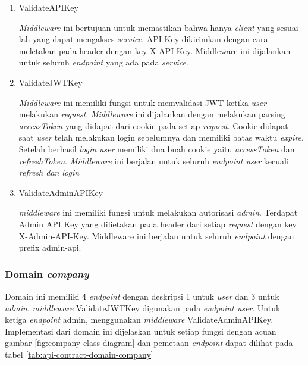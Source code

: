 \begin{enumerate}
  \item ValidateAPIKey

        \textit{Middleware} ini bertujuan untuk memastikan bahwa hanya \textit{client} yang sesuai lah yang dapat mengakses \textit{service}. API Key dikirimkan dengan cara meletakan pada header dengan key X-API-Key. Middleware ini dijalankan untuk seluruh \textit{endpoint} yang ada pada \textit{service}.

  \item ValidateJWTKey

        \textit{Middleware} ini memiliki fungsi untuk memvalidasi JWT ketika \textit{user} melakukan \textit{request}. \textit{Middleware} ini dijalankan dengan melakukan parsing \textit{accessToken} yang didapat dari cookie pada setiap \textit{request}. Cookie didapat saat \textit{user} telah melakukan login sebelumnya dan memiliki batas waktu \textit{expire}. Setelah berhasil \textit{login} \textit{user} memiliki dua buah cookie yaitu \textit{accessToken} dan \textit{refreshToken}.  \textit{Middleware} ini berjalan untuk seluruh \textit{endpoint user} kecuali \textit{refresh dan login}


  \item ValidateAdminAPIKey

        \textit{middleware} ini memiliki fungsi untuk melakukan autorisasi \textit{admin}. Terdapat Admin API Key yang dilietakan pada header dari setiap \textit{request} dengan key X-Admin-API-Key. Middleware ini berjalan untuk seluruh \textit{endpoint} dengan prefix admin-api.
\end{enumerate}


\subsubsection{Domain \textit{company}}

Domain ini memiliki 4 \textit{endpoint} dengan deskripsi 1 untuk \textit{user} dan 3 untuk \textit{admin}. \textit{middleware} ValidateJWTKey digunakan pada \textit{endpoint user}. Untuk ketiga \textit{endpoint} admin, menggunakan \textit{middleware} ValidateAdminAPIKey. Implementasi dari domain ini dijelaskan untuk setiap fungsi dengan acuan gambar \ref{fig:company-class-diagram} dan pemetaan \textit{endpoint} dapat dilihat pada tabel \ref{tab:api-contract-domain-company}


